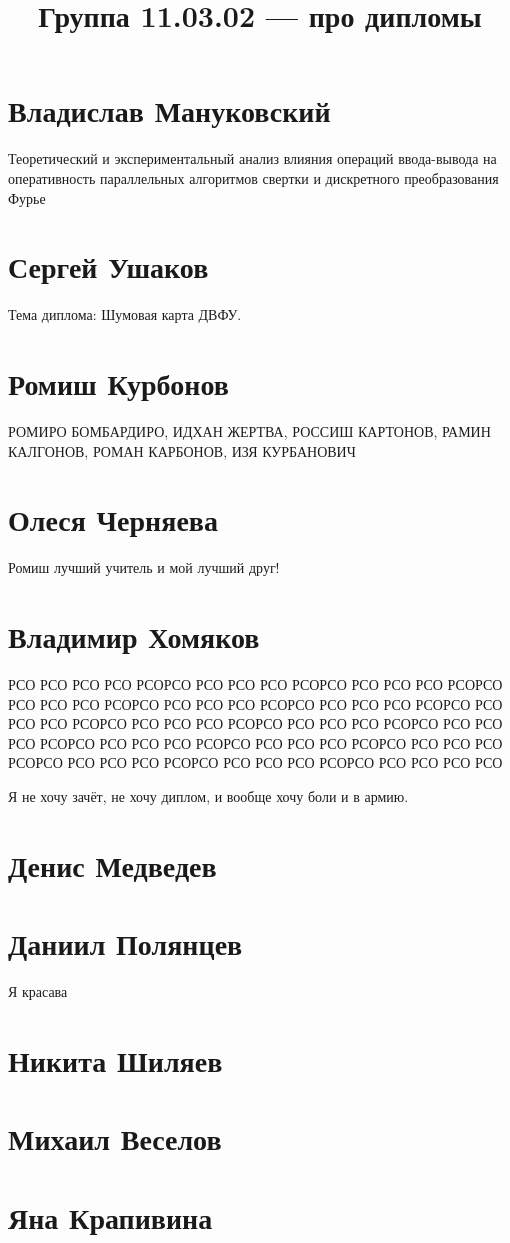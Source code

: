 \documentclass{article}
\title{Группа 11.03.02 --- про дипломы}
\begin{document}
\section*{Владислав Мануковский}
Теоретический и экспериментальный анализ влияния операций ввода-вывода на оперативность параллельных алгоритмов свертки и дискретного преобразования Фурье

\section*{Сергей Ушаков}

Тема диплома: Шумовая карта ДВФУ.

\section*{Ромиш Курбонов}

РОМИРО БОМБАРДИРО, ИДХАН ЖЕРТВА, РОССИШ КАРТОНОВ, РАМИН КАЛГОНОВ, РОМАН КАРБОНОВ, ИЗЯ КУРБАНОВИЧ

\section*{Олеся Черняева}
Ромиш лучший учитель и мой лучший друг!

\section*{Владимир Хомяков}
РСО РСО РСО РСО РСОРСО РСО РСО РСО РСОРСО РСО РСО РСО РСОРСО РСО РСО РСО РСОРСО РСО РСО РСО РСОРСО РСО РСО РСО РСОРСО РСО РСО РСО РСОРСО РСО РСО РСО РСОРСО РСО РСО РСО РСОРСО РСО РСО РСО РСОРСО РСО РСО РСО РСОРСО РСО РСО РСО РСОРСО РСО РСО РСО РСОРСО РСО РСО РСО РСОРСО РСО РСО РСО РСОРСО РСО РСО РСО РСО

Я не хочу зачёт, не хочу диплом, и вообще хочу боли и в армию.
\section*{Денис Медведев}

\section*{Даниил Полянцев}
Я красава

\section*{Никита Шиляев}

\section*{Михаил Веселов}

\section*{Яна Крапивина}
\end{document}
